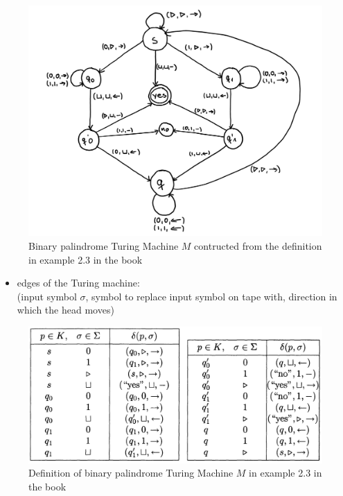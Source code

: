 \documentclass[a4]{scrartcl}
\begin{document}
\begin{figure}[H]
\begin{center}
\includegraphics[scale=0.8]{palindrometm.png}
\end{center}
\caption{Binary palindrome Turing Machine $M$ contructed from the definition in example 2.3 in the book \cite{book}}
\end{figure}

\begin{itemize}
\item edges of the Turing machine: \\
(input symbol $\sigma$, symbol to replace input symbol on tape with, direction in which the head moves)
\end{itemize}

\begin{figure}[H]
\begin{center}
\includegraphics[scale=0.4]{palindrome.jpg}
\end{center}
\caption{Definition of binary palindrome Turing Machine $M$ in example 2.3 in the book \cite{book}}
\end{figure}
\end{document}
